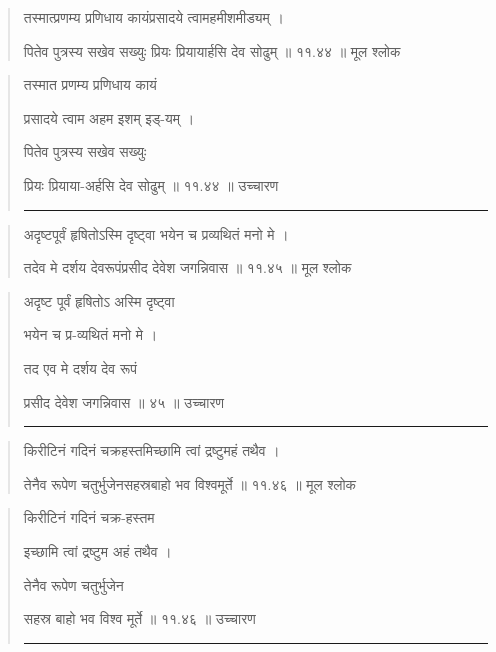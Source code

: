 \begin{quotation} 

तस्मात्प्रणम्य प्रणिधाय कायंप्रसादये त्वामहमीशमीड्यम्‌  ।  

पितेव पुत्रस्य सखेव सख्युः प्रियः प्रियायार्हसि देव सोढुम्‌  ॥ ११.४४ ॥  मूल श्लोक
\end{quotation}

\begin{quotation}

तस्मात प्रणम्य प्रणिधाय कायं

प्रसादये त्वाम अहम इशम् इड्-यम्‌ ।  

पितेव पुत्रस्य सखेव सख्युः 

प्रियः प्रियाया-अर्हसि देव सोढुम्‌  ॥ ११.४४ ॥  उच्चारण

\noindent\rule{16cm}{0.4pt} 
\end{quotation}


\begin{quotation} 

अदृष्टपूर्वं हृषितोऽस्मि दृष्ट्वा भयेन च प्रव्यथितं मनो मे  ।  

तदेव मे दर्शय देवरूपंप्रसीद देवेश जगन्निवास  ॥ ११.४५ ॥   मूल श्लोक
\end{quotation}

\begin{quotation}

अदृष्ट पूर्वं हृषितोऽ अस्मि दृष्ट्वा 

भयेन च प्र-व्यथितं मनो मे  ।  

तद एव मे दर्शय देव रूपं 

प्रसीद देवेश जगन्निवास  ॥ ४५ ॥  उच्चारण

\noindent\rule{16cm}{0.4pt} 
\end{quotation}


\begin{quotation} 

किरीटिनं गदिनं चक्रहस्तमिच्छामि त्वां द्रष्टुमहं तथैव  ।  

तेनैव रूपेण चतुर्भुजेनसहस्रबाहो भव विश्वमूर्ते  ॥ ११.४६ ॥  मूल श्लोक
\end{quotation}

\begin{quotation}

किरीटिनं गदिनं चक्र-हस्तम 

इच्छामि त्वां द्रष्टुम अहं तथैव  ।  

तेनैव रूपेण चतुर्भुजेन 

सहस्र बाहो भव विश्व मूर्ते ॥ ११.४६ ॥  उच्चारण

\noindent\rule{16cm}{0.4pt} 
\end{quotation}




